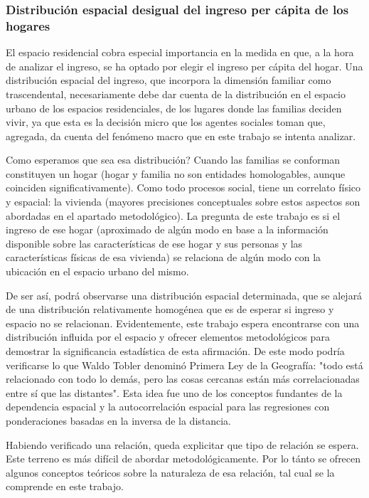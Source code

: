  
\subsubsection{Distribución espacial desigual del ingreso per cápita de los hogares}

El espacio residencial cobra especial importancia en la medida en que, a la hora de analizar el ingreso, se ha optado por elegir el ingreso per cápita del hogar. Una distribución espacial del ingreso, que incorpora la dimensión familiar como trascendental, necesariamente debe dar cuenta de la distribución en el espacio urbano de los espacios residenciales, de los lugares donde las familias deciden vivir, ya que esta es la decisión micro que los agentes sociales toman que, agregada, da cuenta del fenómeno macro que en este trabajo se intenta analizar.


Como esperamos que sea esa distribución? Cuando las familias se conforman constituyen un hogar (hogar y familia no son entidades homologables, aunque coinciden significativamente). Como todo procesos social, tiene un correlato físico y espacial: la vivienda (mayores precisiones conceptuales sobre estos aspectos son abordadas en el apartado metodológico). La pregunta de este trabajo es si el ingreso de ese hogar (aproximado de algún modo en base a la información disponible sobre las características de ese hogar y sus personas y las características físicas de esa vivienda) se relaciona de algún modo con la ubicación en el espacio urbano del mismo.

De ser así, podrá observarse una distribución espacial determinada, que se alejará de una distribución relativamente homogénea que es de esperar si ingreso y espacio no se relacionan. Evidentemente, este trabajo espera encontrarse con una distribución influida por el espacio y ofrecer elementos metodológicos para demostrar la significancia estadística de esta afirmación. De este modo podría verificarse lo que Waldo Tobler \citeyear{tobler} denominó Primera Ley de la Geografía: "todo está relacionado con todo lo demás, pero las cosas cercanas están más correlacionadas entre sí que las distantes". Esta idea fue uno de los conceptos fundantes de la dependencia espacial y la autocorrelación espacial para las regresiones con ponderaciones basadas en la inversa de la distancia. 

Habiendo verificado una relación, queda explicitar que tipo de relación se espera. Este terreno es más difícil de abordar metodológicamente. Por lo tánto se ofrecen algunos conceptos teóricos sobre la naturaleza de esa relación, tal cual se la comprende en este trabajo.  

